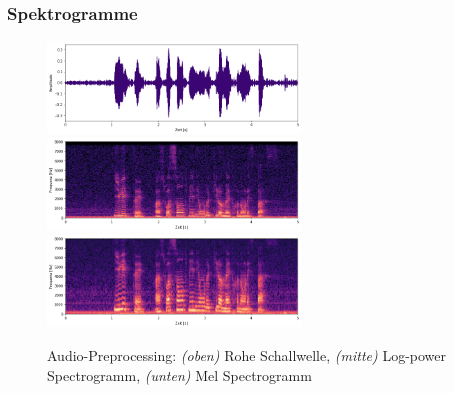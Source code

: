 \subsubsection{Spektrogramme}
\begin{figure}[hbt]
	\centering
		\includegraphics[width=0.6\textwidth]{assets/audio_raw.png}
		\includegraphics[width=0.6\textwidth]{assets/audio_log.png}
		\includegraphics[width=0.6\textwidth]{assets/audio_mel.png}
	\centering
	\caption{Audio-Preprocessing: \textit{(oben)} Rohe Schallwelle, \textit{(mitte)}
		     Log-power Spectrogramm, 
		     \textit{(unten)} Mel Spectrogramm}
	\label{img:preprocessing}
\end{figure}


